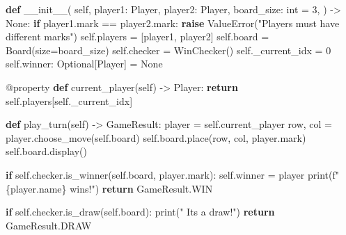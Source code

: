 \documentclass[11pt]{article}
\newenvironment{Shaded}{\begin{snugshade}}{\end{snugshade}}
\newcommand{\AttributeTok}[1]{\textcolor[rgb]{0.16,0.50,0.73}{#1}}
\newcommand{\BuiltInTok}[1]{\textcolor[rgb]{0.50,0.55,0.55}{#1}}
\newcommand{\ControlFlowTok}[1]{\textcolor[rgb]{0.99,0.74,0.29}{\textbf{#1}}}
\newcommand{\DecValTok}[1]{\textcolor[rgb]{0.96,0.45,0.00}{#1}}
\newcommand{\FunctionTok}[1]{\textcolor[rgb]{0.56,0.27,0.68}{#1}}
\newcommand{\KeywordTok}[1]{\textcolor[rgb]{0.81,0.81,0.76}{\textbf{#1}}}
\newcommand{\NormalTok}[1]{\textcolor[rgb]{0.81,0.81,0.76}{#1}}
\newcommand{\OperatorTok}[1]{\textcolor[rgb]{0.81,0.81,0.76}{#1}}
\newcommand{\PreprocessorTok}[1]{\textcolor[rgb]{0.15,0.68,0.38}{#1}}
\newcommand{\SpecialCharTok}[1]{\textcolor[rgb]{0.24,0.68,0.91}{#1}}
\newcommand{\SpecialStringTok}[1]{\textcolor[rgb]{0.85,0.27,0.33}{#1}}
\newcommand{\StringTok}[1]{\textcolor[rgb]{0.96,0.31,0.31}{#1}}
\newcommand{\VariableTok}[1]{\textcolor[rgb]{0.15,0.68,0.68}{#1}}
\begin{document}
\begin{Shaded}
\begin{Highlighting}[]
    \KeywordTok{def} \FunctionTok{\_\_init\_\_}\NormalTok{(}
        \VariableTok{self}\NormalTok{,}
\NormalTok{        player1: Player,}
\NormalTok{        player2: Player,}
\NormalTok{        board\_size: }\BuiltInTok{int} \OperatorTok{=} \DecValTok{3}\NormalTok{,}
\NormalTok{    ) }\OperatorTok{{-}\textgreater{}} \VariableTok{None}\NormalTok{:}
        \ControlFlowTok{if}\NormalTok{ player1.mark }\OperatorTok{==}\NormalTok{ player2.mark:}
            \ControlFlowTok{raise} \PreprocessorTok{ValueError}\NormalTok{(}\StringTok{"Players must have different marks"}\NormalTok{)}
        \VariableTok{self}\NormalTok{.players }\OperatorTok{=}\NormalTok{ [player1, player2]}
        \VariableTok{self}\NormalTok{.board }\OperatorTok{=}\NormalTok{ Board(size}\OperatorTok{=}\NormalTok{board\_size)}
        \VariableTok{self}\NormalTok{.checker }\OperatorTok{=}\NormalTok{ WinChecker()}
        \VariableTok{self}\NormalTok{.\_current\_idx }\OperatorTok{=} \DecValTok{0}
        \VariableTok{self}\NormalTok{.winner: Optional[Player] }\OperatorTok{=} \VariableTok{None}

    \AttributeTok{@property}
    \KeywordTok{def}\NormalTok{ current\_player(}\VariableTok{self}\NormalTok{) }\OperatorTok{{-}\textgreater{}}\NormalTok{ Player:}
        \ControlFlowTok{return} \VariableTok{self}\NormalTok{.players[}\VariableTok{self}\NormalTok{.\_current\_idx]}

    \KeywordTok{def}\NormalTok{ play\_turn(}\VariableTok{self}\NormalTok{) }\OperatorTok{{-}\textgreater{}}\NormalTok{ GameResult:}
\NormalTok{        player }\OperatorTok{=} \VariableTok{self}\NormalTok{.current\_player}
\NormalTok{        row, col }\OperatorTok{=}\NormalTok{ player.choose\_move(}\VariableTok{self}\NormalTok{.board)}
        \VariableTok{self}\NormalTok{.board.place(row, col, player.mark)}
        \VariableTok{self}\NormalTok{.board.display()}

        \ControlFlowTok{if} \VariableTok{self}\NormalTok{.checker.is\_winner(}\VariableTok{self}\NormalTok{.board, player.mark):}
            \VariableTok{self}\NormalTok{.winner }\OperatorTok{=}\NormalTok{ player}
            \BuiltInTok{print}\NormalTok{(}\SpecialStringTok{f"  }\SpecialCharTok{\{}\NormalTok{player}\SpecialCharTok{.}\NormalTok{name}\SpecialCharTok{\}}\SpecialStringTok{ wins!"}\NormalTok{)}
            \ControlFlowTok{return}\NormalTok{ GameResult.WIN}

        \ControlFlowTok{if} \VariableTok{self}\NormalTok{.checker.is\_draw(}\VariableTok{self}\NormalTok{.board):}
            \BuiltInTok{print}\NormalTok{(}\StringTok{"  It\textquotesingle{}s a draw!"}\NormalTok{)}
            \ControlFlowTok{return}\NormalTok{ GameResult.DRAW}


\end{Highlighting}
\end{Shaded}
\end{document}
